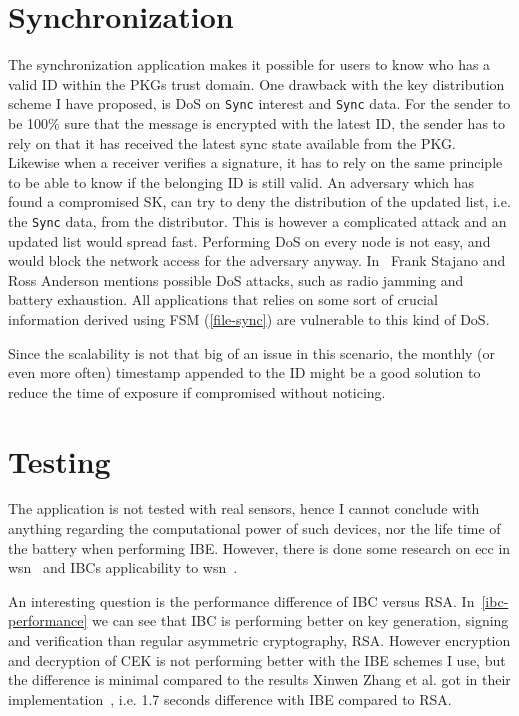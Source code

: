\section{Synchronization}
The synchronization application makes it possible for users to know who has a valid \gls{ID} within the \gls{PKG}s trust domain.
One drawback with the key distribution scheme I have proposed, is \gls{DoS} on \texttt{Sync} \gls{interest} and \texttt{Sync} \gls{data}. 
For the sender to be 100\% sure that the message is encrypted with the latest \gls{ID}, the sender has to rely on that it has received the latest sync state available from the \gls{PKG}.
Likewise when a \gls{receiver} verifies a signature, it has to rely on the same principle to be able to know if the belonging \gls{ID} is still valid.
An adversary which has found a compromised \gls{SK}, can try to deny the distribution of the updated list, i.e. the \texttt{Sync} \gls{data}, from the distributor. 
This is however a complicated attack and an updated list would spread fast.
Performing \gls{DoS} on every node is not easy, and would block the network access for the adversary anyway.
In~\cite{DBLP:conf/spw/StajanoA99} Frank Stajano and Ross Anderson mentions possible \gls{DoS} attacks, such as radio jamming and battery exhaustion. 
All applications that relies on some sort of crucial information derived using \gls{FSM} (\autoref{file-sync}) are vulnerable to this kind of \gls{DoS}.

Since the scalability is not that big of an issue in this scenario, the monthly (or even more often) timestamp appended to the \gls{ID} might be a good solution to reduce the time of exposure if compromised without noticing.

\section{Testing}
The application is not tested with real sensors, hence I cannot conclude with anything regarding the computational power of such devices, nor the life time of the battery when performing \gls{IBE}.
However, there is done some research on \gls{ecc} in \gls{wsn}~\cite{DBLP:conf/ipsn/LiuN08, DBLP:conf/ewsn/SzczechowiakOSCD08} and \gls{IBC}s applicability to \gls{wsn}~\cite{DBLP:journals/iacr/OliveiraAMDLD07}.

An interesting question is the performance difference of \gls{IBC} versus RSA.
In~\autoref{ibc-performance} we can see that \gls{IBC} is performing better on key generation, signing and verification than regular asymmetric cryptography, RSA. 
However encryption and decryption of \gls{CEK} is not performing better with the \gls{IBE} schemes I use, but the difference is minimal compared to the results Xinwen Zhang et al. got in their implementation~\cite{DBLP:conf/icnp/ZhangCXWSW11}, i.e. 1.7 seconds difference with \gls{IBE} compared to RSA.

